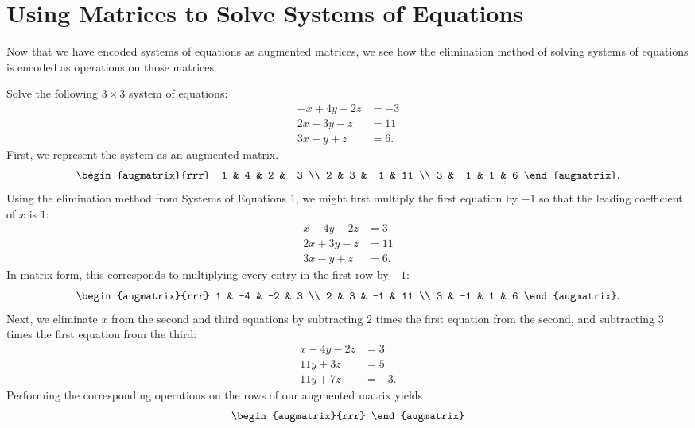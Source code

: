 \documentclass{article}
\begin{document}

\section{Using Matrices to Solve Systems of Equations}\label{sec:using-matrices}

Now that we have encoded systems of equations as augmented matrices, we see how the elimination method of solving systems of equations is encoded as operations on those matrices.

\begin{example}\label{ex:elimination-matrix}
Solve the following \(3\times 3\) system of equations:
\begin{align*}
-x + 4y + 2z &= -3 \\
2x + 3y - z &= 11 \\
3x - y + z &= 6.
\end{align*}
First, we represent the system as an augmented matrix.
\[
\begin{augmatrix}{rrr}
-1 & 4 & 2 & -3 \\
2 & 3 & -1 & 11 \\
3 & -1 & 1 & 6
\end{augmatrix}.
\]
Using the elimination method from Systems of Equations 1, we might first multiply the first equation by \(-1\) so that the leading coefficient of \(x\) is \(1\):
\begin{align*}
x - 4y - 2z &= 3 \\
2x + 3y - z &= 11 \\
3x - y + z &= 6.
\end{align*}
In matrix form, this corresponds to multiplying every entry in the first row by \(-1\):
\[
\begin{augmatrix}{rrr}
1 & -4 & -2 & 3 \\
2 & 3 & -1 & 11 \\
3 & -1 & 1 & 6
\end{augmatrix}.
\]
Next, we eliminate \(x\) from the second and third equations by subtracting \(2\) times the first equation from the second, and subtracting \(3\) times the first equation from the third:
\begin{align*}
x - 4y - 2z &= 3 \\
11y + 3z &= 5 \\
11y + 7z &= -3.
\end{align*}
Performing the corresponding operations on the rows of our augmented matrix yields
\[
\begin{augmatrix}{rrr}

\end{augmatrix}\]
\end{example}
\end{document}
